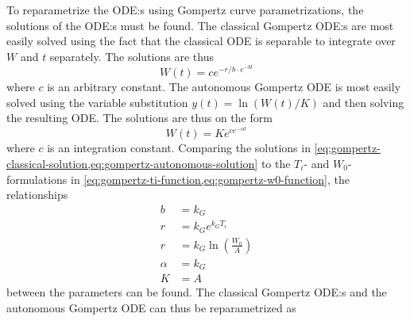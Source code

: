 To reparametrize the ODE:s using Gompertz curve parametrizations, the solutions of the ODE:s must be found.
The classical Gompertz ODE:s  are most easily solved using the fact that the classical ODE is separable to integrate over \(W\) and \(t\) separately.
The solutions are thus
\begin{equation} \label{eq:gompertz-classical-solution}
  W(t) = c e^{-r/b \cdot e^{-b t}}
\end{equation}
where \(c\) is an arbitrary constant.
The autonomous Gompertz ODE  is most easily solved using the variable substitution \(y(t) = \ln(W(t)/K)\) and then solving the resulting ODE.
The solutions are thus on the form
\begin{equation} \label{eq:gompertz-autonomous-solution}
  W(t) = K e^{c e^{-\alpha t}}
\end{equation}
where \(c\) is an integration constant.
Comparing the solutions in \cref{eq:gompertz-classical-solution,eq:gompertz-autonomous-solution} to the \(T_i\)- and \(W_0\)-formulations in \cref{eq:gompertz-ti-function,eq:gompertz-w0-function}, the relationships
\begin{align}
  b &= k_G\\
  r &= k_G e^{k_G T_i}\\
  r &= k_G \ln(\frac{W_0}{A})\\
  \alpha &= k_G\\
  K &= A
\end{align}
between the parameters can be found.
The classical Gompertz ODE:s  and the autonomous Gompertz ODE  can thus be reparametrized as


